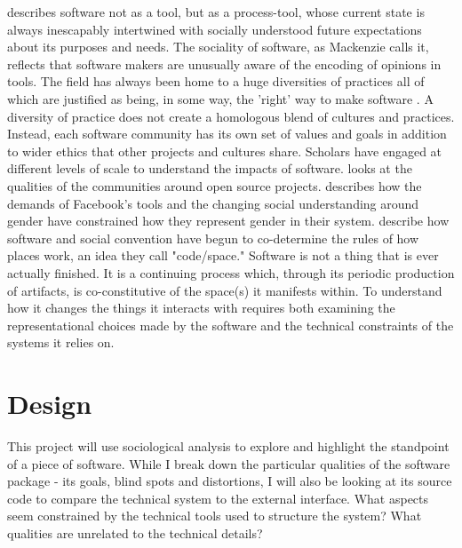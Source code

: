 \documentclass[a4paper,man,natbib]{apa6}
\begin{document}

   \citet{Mackenzie2006-hb} describes software not as a tool, but as a process-tool, whose current state is always inescapably intertwined with socially understood future expectations about its purposes and needs. The sociality of software, as Mackenzie calls it, reflects that software makers are unusually aware of the encoding of opinions in tools. The field has always been home to a huge diversities of practices all of which are justified as being, in some way, the 'right' way to make software \citep{Ensmenger2012-kz}. A diversity of practice does not create a homologous blend of cultures and practices. Instead, each software community has its own set of values and goals in addition to wider ethics that other projects and cultures share. Scholars have engaged at different levels of scale to understand the impacts of software. \citet{Kelty2008-jm} looks at the qualities of the communities around open source projects. \citet{Bivens2017-tc} describes how the demands of Facebook's tools and the changing social understanding around gender have constrained how they represent gender in their system. \citep{Kitchin2011-af} describe how software and social convention have begun to co-determine the rules of how places work, an idea they call "code/space." Software is not a thing that is ever actually finished. It is a continuing process which, through its periodic production of artifacts, is co-constitutive of the space(s) it manifests within. To understand how it changes the things it interacts with requires both examining the representational choices made by the software and the technical constraints of the systems it relies on.

   \section*{Design}
   This project will use sociological analysis to explore and highlight the standpoint of a piece of software. While I break down the particular qualities of the software package -  its goals, blind spots and distortions, I will also be looking at its source code to compare the technical system to the external interface. What aspects seem constrained by the technical tools used to structure the system? What qualities are unrelated to the technical details?
\end{document}
